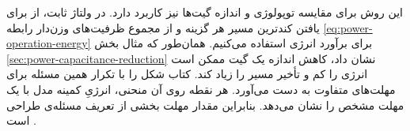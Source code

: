 این روش برای مقایسه توپولوژی و اندازه گیت‌ها نیز کاربرد دارد.
در ولتاژ ثابت، از 
برای یافتن کندترین مسیر هر گزینه و از مجموع ظرفیت‌های وزن‌دار
رابطه \eqref{eq:power-operation-energy} برای برآورد انرژی استفاده
می‌کنیم. همان‌طور که مثال بخش \ref{sec:power-capacitance-reduction}
نشان داد، کاهش اندازه یک گیت ممکن است انرژی را کم و تأخیر مسیر را
زیاد کند. کتاب شکل  را با تکرار همین مسئله برای
مهلت‌های متفاوت به دست می‌آورد. هر نقطه روی آن منحنی، انرژیِ کمینه
مدل با یک مهلت مشخص را نشان می‌دهد. بنابراین مقدار مهلت بخشی از
تعریف مسئله‌ی طراحی است \cite[بخش‌های  و
، صفحات ۱۸۹، ۱۹۰، ۲۰۳ و ۲۰۴]{weste}.
